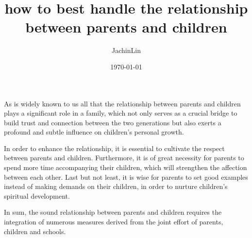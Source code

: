 \documentclass{article}
\title{	how to best handle the relationship between parents and children }
\author{JachinLin}
\date{\today}
\begin{document}
	\maketitle
	As is widely known to us all that the relationship between parents and children plays a significant role in a family, which not only serves as a crucial bridge to build trust and connection between the two generations but also exerts a profound and subtle influence on children’s personal growth.
	
	In order to enhance the relationship, it is essential to cultivate the respect between parents and children. Furthermore, it is of great necessity for parents to spend more time accompanying their children, which will strengthen the affection between each other. Last but not least, it is wise for parents to set good examples instead of making demands on their children, in order to nurture children’s spiritual development.
	
	In sum, the sound relationship between parents and children requires the integration of numerous measures derived from the joint effort of parents, children and schools.
	
	\begin{comment}
	众所周知，父母与子女之间的关系在家庭中起着重要的作用，它不仅是建立两代人之间的信任和联系的重要桥梁，而且对子女的人格产生了深远而微妙的影响。
	
	为了增进关系，必须培养父母与孩子之间的尊重。此外，父母必须花更多的时间陪伴孩子，这将加强彼此之间的感情。最后但并非最不重要的一点是，为了培养孩子的精神发展，父母树立榜样而不是对孩子提出要求是明智的。
	
	总而言之，父母与孩子之间的良好关系需要整合众多由父母，孩子和学校共同努力而产生的措施。
	\end{comment}
\end{document}
